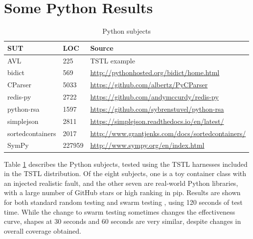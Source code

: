 \section{Some Python Results}


\begin{table}
\centering
\caption{Python subjects}
\label{tab:subjects}
{\scriptsize
\begin{tabular}{l|ll}
SUT & LOC & Source \\
\hline
AVL & 225 & TSTL example \cite{avltree} \\
bidict & 569 & \url{http://pythonhosted.org/bidict/home.html} \\
CParser & 5033 & \url{https://github.com/albertz/PyCParser}\\
redis-py & 2722 & \url{https://github.com/andymccurdy/redis-py}\\
python-rsa & 1597 & \url{https://github.com/sybrenstuvel/python-rsa} \\
simplejson & 2811 & \url{https://simplejson.readthedocs.io/en/latest/} \\
sortedcontainers & 2017 & \url{http://www.grantjenks.com/docs/sortedcontainers/} \\
SymPy & 227959 & \url{http://www.sympy.org/en/index.html} \\
\end{tabular}
}
\end{table}

Table \ref{tab:subjects} describes the Python subjects, tested using
the TSTL \cite{tstlsttt,NFM15} harnesses included in the TSTL
distribution.  Of the eight subjects, one is a toy container class
with an injected realistic fault, and the other seven are real-world
Python libraries, with a large number of GitHub stars or high
ranking in pip.  Results are shown for both standard random testing
and swarm testing \cite{ISSTA12}, using 120 seconds of test time.
While the change to swarm testing sometimes changes the effectiveness
curve, shapes at 30 seconds and 60 seconds are very similar, despite
changes in overall coverage obtained.

\newpage

